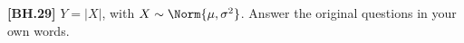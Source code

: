 \begin{exercise}
	\textbf{[BH.29]}  $Y=|X|$, with $X \sim  \Norm{\mu, \sigma^2}$. Answer the original questions in your own words.
\end{exercise}

